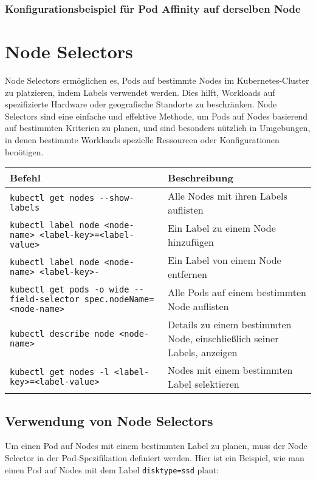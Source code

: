 \subsubsection{Konfigurationsbeispiel für Pod Affinity auf derselben Node}


\newpage
\section{Node Selectors}
Node Selectors ermöglichen es, Pods auf bestimmte Nodes im Kubernetes-Cluster zu platzieren, indem Labels verwendet werden. Dies hilft, Workloads auf spezifizierte Hardware oder geografische Standorte zu beschränken. Node Selectors sind eine einfache und effektive Methode, um Pods auf Nodes basierend auf bestimmten Kriterien zu planen, und sind besonders nützlich in Umgebungen, in denen bestimmte Workloads spezielle Ressourcen oder Konfigurationen benötigen.\\

\noindent
\begin{tabular}{
|p{}|p{}|}
\hline
\textbf{Befehl} & \textbf{Beschreibung} \\
\hline
\texttt{kubectl get nodes {-}{-}show-labels} & Alle Nodes mit ihren Labels auflisten \\
\texttt{kubectl label node <node-name> <label-key>=<label-value>} & Ein Label zu einem Node hinzufügen \\
\texttt{kubectl label node <node-name> <label-key>-} & Ein Label von einem Node entfernen \\
\texttt{kubectl get pods -o wide {-}{-}field-selector spec.nodeName=<node-name>} & Alle Pods auf einem bestimmten Node auflisten \\
\texttt{kubectl describe node <node-name>} & Details zu einem bestimmten Node, einschließlich seiner Labels, anzeigen \\
\texttt{kubectl get nodes -l <label-key>=<label-value>} & Nodes mit einem bestimmten Label selektieren \\
\hline
\end{tabular}

\subsection{Verwendung von Node Selectors}
Um einen Pod auf Nodes mit einem bestimmten Label zu planen, muss der Node Selector in der Pod-Spezifikation definiert werden. Hier ist ein Beispiel, wie man einen Pod auf Nodes mit dem Label \texttt{disktype=ssd} plant:



